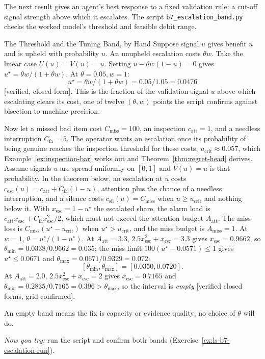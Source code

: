 \documentclass[11pt,a4paper]{article}
\theoremstyle{definition}
\theoremstyle{plain}
\begin{document}
The next result gives an agent's best response to a fixed validation rule: a
cut-off signal strength above which it escalates. The script
\texttt{b7\_escalation\_band.py} checks the worked model's threshold and
feasible debit range.

\begin{pdexample}{The Threshold and the Tuning Band, by Hand}
\setlength{\parskip}{4pt plus 1pt}
Suppose signal $u$ gives benefit $u$ and is upheld with probability $u$. An
unupheld escalation costs $\theta w$. Take the linear case $U(u)=V(u)=u$. Setting
$u-\theta w(1-u)=0$ gives $u^\star=\theta w/(1+\theta w)$.
At $\theta=0.05,w=1$:%
\[
u^\star=\theta w/(1+\theta w)=0.05/1.05=0.0476
\]
[verified, closed form]. This is the fraction of the validation signal $u$ above which escalating clears its cost, one of twelve $(\theta,w)$ points the script confirms against bisection to machine precision.

Now let a missed bad item cost $C_{\mathrm{miss}}=100$, an inspection $c_{\mathrm{att}}=1$, and a needless interruption $C_{\mathrm{fa}}=5$. The operator wants an escalation once its probability of being genuine reaches the inspection threshold for these costs, $u_{\mathrm{crit}}\approx0.057$, which Example~\ref{ex:inspection-bar} works out and Theorem~\ref{thm:regret-head} derives. Assume signals $u$ are spread uniformly on $[0,1]$ and $V(u)=u$ is that probability. In the theorem below, an escalation at $u$ costs $c_{\mathrm{esc}}(u)=c_{\mathrm{att}}+C_{\mathrm{fa}}(1-u)$, attention plus the chance of a needless interruption, and a silence costs $c_{\mathrm{sil}}(u)=C_{\mathrm{miss}}$ when $u\ge u_{\mathrm{crit}}$ and nothing below it. With $x_{\mathrm{esc}}=1-u^\star$ the escalated share, the alarm load is $c_{\mathrm{att}}x_{\mathrm{esc}}+C_{\mathrm{fa}}x_{\mathrm{esc}}^2/2$, which must not exceed the attention budget $A_{\mathrm{att}}$. The miss loss is $C_{\mathrm{miss}}(u^\star-u_{\mathrm{crit}})$ when $u^\star>u_{\mathrm{crit}}$, and the miss budget is $A_{\mathrm{miss}}=1$. At $w=1$, $\theta=u^\star/(1-u^\star)$. At $A_{\mathrm{att}}=3.3$, $2.5x_{\mathrm{esc}}^2+x_{\mathrm{esc}}=3.3$ gives $x_{\mathrm{esc}}=0.9662$, so $\theta_{\min}=0.0338/0.9662=0.035$; the miss limit $100(u^\star-0.0571)\le1$ gives $u^\star\le0.0671$ and $\theta_{\max}=0.0671/0.9329=0.072$:
\[
[\theta_{\min},\theta_{\max}]=[0.0350,0.0720].
\]
At $A_{\mathrm{att}}=2.0$, $2.5x_{\mathrm{esc}}^2+x_{\mathrm{esc}}=2$ gives $x_{\mathrm{esc}}=0.7165$ and $\theta_{\min}=0.2835/0.7165=0.396>\theta_{\max}$, so the interval is \emph{empty} [verified closed forms, grid-confirmed].

An empty band means the fix is capacity or evidence quality; no choice of $\theta$ will do.

\emph{Now you try:} run the script and confirm both bands (Exercise~\ref{ex:ls-b7-escalation-run}).
\end{pdexample}
\end{document}
